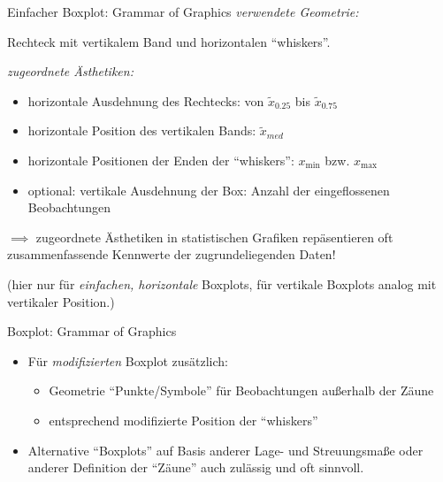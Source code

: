 \documentclass[
  10pt,
  ignorenonframetext,
]{beamer}
\providecommand{\tightlist}{%
  \setlength{\itemsep}{0pt}\setlength{\parskip}{0pt}}
\begin{document}
\begin{frame}{Einfacher Boxplot: Grammar of Graphics}
\protect\hypertarget{einfacher-boxplot-grammar-of-graphics}{}
\emph{verwendete Geometrie:}

Rechteck mit vertikalem Band und horizontalen ``whiskers''.

\emph{zugeordnete Ästhetiken:}

\begin{itemize}
\tightlist
\item
  horizontale Ausdehnung des Rechtecks: von \(\tilde x_{0.25}\) bis
  \(\tilde x_{0.75}\)
\item
  horizontale Position des vertikalen Bands: \(\tilde x_{med}\)
\item
  horizontale Positionen der Enden der ``whiskers'': \(x_{\min}\) bzw.
  \(x_{\max}\)
\item
  optional: vertikale Ausdehnung der Box: Anzahl der eingeflossenen
  Beobachtungen
\end{itemize}

\(\implies\) zugeordnete Ästhetiken in statistischen Grafiken
repäsentieren oft zusammenfassende Kennwerte der zugrundeliegenden
Daten!

\scriptsize (hier nur für \textit{einfachen, horizontale} Boxplots, für
vertikale Boxplots analog mit vertikaler Position.)
\end{frame}

\begin{frame}{Boxplot: Grammar of Graphics}
\protect\hypertarget{boxplot-grammar-of-graphics}{}
\begin{itemize}
\tightlist
\item
  Für \emph{modifizierten} Boxplot zusätzlich:

  \begin{itemize}
  \tightlist
  \item
    Geometrie ``Punkte/Symbole'' für Beobachtungen außerhalb der Zäune
  \item
    entsprechend modifizierte Position der ``whiskers''
  \end{itemize}
\item
  Alternative ``Boxplots'' auf Basis anderer Lage- und Streuungsmaße
  oder anderer Definition der ``Zäune'' auch zulässig und oft sinnvoll.
\end{itemize}
\end{frame}
\end{document}
